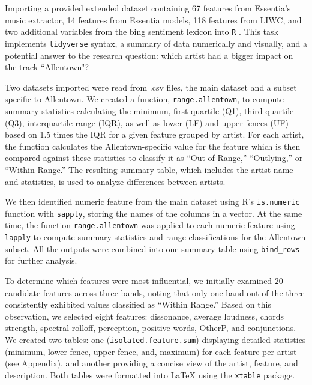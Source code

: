 \documentclass{article}\usepackage[]{graphicx}\usepackage[]{xcolor}
\begin{document}
\begin{multicols}{2}
Importing a provided extended dataset containing 67 features from Essentia’s music extractor, 14 features from Essentia models, 118 features from LIWC, and two additional variables from the bing sentiment lexicon\citep{HuLiu2004} into \texttt{R} . This task implements \texttt{tidyverse}\citep{tidyverse} syntax, a summary of data numerically and visually, and a potential answer to the research question: which artist had a bigger impact on the track ``Allentown"\citep{Ross}?

Two datasets imported were read from .csv files, the main dataset and a subset specific to Allentown. We created a function, \texttt{range.allentown}, to compute summary statistics calculating the minimum, first quartile (Q1), third quartile (Q3), interquartile range (IQR), as well as lower (LF) and upper fences (UF) based on 1.5 times the IQR for a given feature grouped by artist. For each artist, the function calculates the Allentown-specific value for the feature which is then compared against these statistics to classify it as “Out of Range,” “Outlying,” or “Within Range.” The resulting summary table, which includes the artist name and statistics, is used to analyze differences between artists. 

We then identified numeric feature from the main dataset using R’s \texttt{is.numeric} function with \texttt{sapply}, storing the names of the columns in a vector. At the same time, the function \texttt{range.allentown} was applied to each numeric feature using \texttt{lapply} to compute summary statistics and range classifications for the Allentown subset. All the outputs were combined into one summary table using \texttt{bind\_rows} for further analysis.

To determine which features were most influential, we initially examined 20 candidate features across three bands, noting that only one band out of the three consistently exhibited values classified as “Within Range.” Based on this observation, we selected eight features: dissonance, average loudness, chords strength, spectral rolloff, perception, positive words, OtherP, and conjunctions. We created two tables: one (\texttt{isolated.feature.sum}) displaying detailed statistics (minimum, lower fence, upper fence, and, maximum) for each feature per artist (see Appendix), and another providing a concise view of the artist, feature, and description. Both tables were formatted into LaTeX using the \texttt{xtable} package\citep{Xtable}.


\end{multicols}
\end{document}
